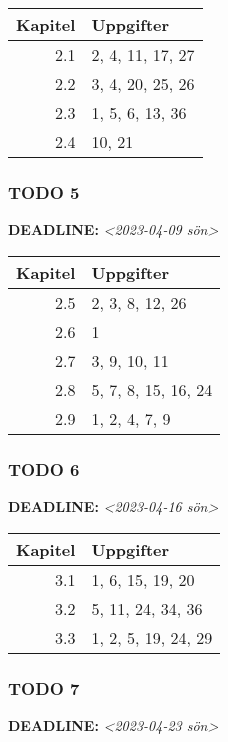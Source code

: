 \documentclass[11pt]{article}
\begin{document}
\begin{center}
\begin{tabular}{rl}
Kapitel & Uppgifter\\[0pt]
\hline
2.1 & 2, 4, 11, 17, 27\\[0pt]
2.2 & 3, 4, 20, 25, 26\\[0pt]
2.3 & 1, 5, 6, 13, 36\\[0pt]
2.4 & 10, 21\\[0pt]
\end{tabular}
\end{center}


\subsubsection{{\bfseries\sffamily TODO} 5}
\label{sec:org1dbca32}
\noindent\textbf{DEADLINE:} \textit{<2023-04-09 sön>}\\[0pt]

\begin{center}
\begin{tabular}{rl}
Kapitel & Uppgifter\\[0pt]
\hline
2.5 & 2, 3, 8, 12, 26\\[0pt]
2.6 & 1\\[0pt]
2.7 & 3, 9, 10, 11\\[0pt]
2.8 & 5, 7, 8, 15, 16, 24\\[0pt]
2.9 & 1, 2, 4, 7, 9\\[0pt]
\end{tabular}
\end{center}

\subsubsection{{\bfseries\sffamily TODO} 6}
\label{sec:orge5d3948}
\noindent\textbf{DEADLINE:} \textit{<2023-04-16 sön>}\\[0pt]

\begin{center}
\begin{tabular}{rl}
Kapitel & Uppgifter\\[0pt]
\hline
3.1 & 1, 6, 15, 19, 20\\[0pt]
3.2 & 5, 11, 24, 34, 36\\[0pt]
3.3 & 1, 2, 5, 19, 24, 29\\[0pt]
\end{tabular}
\end{center}

\subsubsection{{\bfseries\sffamily TODO} 7}
\label{sec:orgad5bcb2}
\noindent\textbf{DEADLINE:} \textit{<2023-04-23 sön>}\\[0pt]
\end{document}
